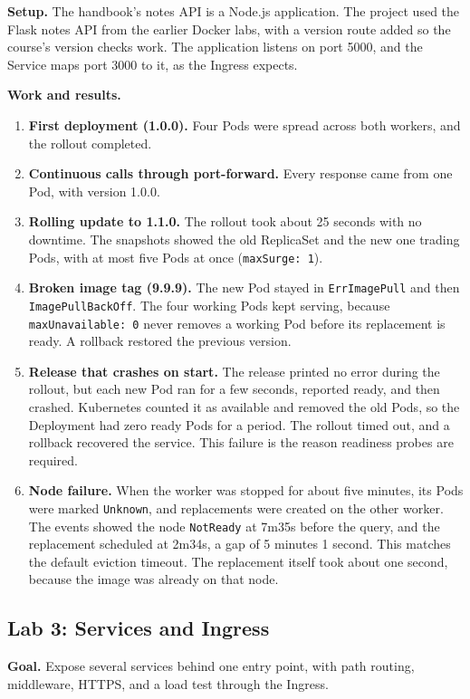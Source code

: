 \documentclass[11pt,a4paper]{article}
\begin{document}
\textbf{Setup.} The handbook's notes API is a Node.js application. The project used the Flask notes API from the earlier Docker labs, with a version route added so the course's version checks work. The application listens on port 5000, and the Service maps port 3000 to it, as the Ingress expects.

\textbf{Work and results.}
\begin{enumerate}[leftmargin=*]
  \item \textbf{First deployment (1.0.0).} Four Pods were spread across both workers, and the rollout completed.
  \item \textbf{Continuous calls through port-forward.} Every response came from one Pod, with version 1.0.0.
  \item \textbf{Rolling update to 1.1.0.} The rollout took about 25 seconds with no downtime. The snapshots showed the old ReplicaSet and the new one trading Pods, with at most five Pods at once (\texttt{maxSurge: 1}).
  \item \textbf{Broken image tag (9.9.9).} The new Pod stayed in \texttt{ErrImagePull} and then \texttt{ImagePullBackOff}. The four working Pods kept serving, because \texttt{maxUnavailable: 0} never removes a working Pod before its replacement is ready. A rollback restored the previous version.
  \item \textbf{Release that crashes on start.} The release printed no error during the rollout, but each new Pod ran for a few seconds, reported ready, and then crashed. Kubernetes counted it as available and removed the old Pods, so the Deployment had zero ready Pods for a period. The rollout timed out, and a rollback recovered the service. This failure is the reason readiness probes are required.
  \item \textbf{Node failure.} When the worker was stopped for about five minutes, its Pods were marked \texttt{Unknown}, and replacements were created on the other worker. The events showed the node \texttt{NotReady} at 7m35s before the query, and the replacement scheduled at 2m34s, a gap of 5 minutes 1 second. This matches the default eviction timeout. The replacement itself took about one second, because the image was already on that node.
\end{enumerate}

\subsection{Lab 3: Services and Ingress}
\textbf{Goal.} Expose several services behind one entry point, with path routing, middleware, HTTPS, and a load test through the Ingress.
\end{document}
